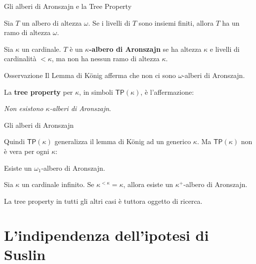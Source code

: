 \documentclass{beamer}
\theoremstyle{num.custom-title}
\theoremstyle{custom-title}
\newcommand{\TP}{\ensuremath{\mathsf{TP}}\xspace}
\renewcommand{\emph}[1]{\textbf{#1}}
\begin{document}
\begin{frame}{Gli alberi di Aronszajn e la Tree Property}

\begin{lemma}[König]
Sia $T$ un albero di altezza $\omega$. Se i livelli di $T$ sono insiemi finiti, allora $T$ ha un ramo di altezza $\omega$.
\end{lemma}

\pause

\begin{definition}
Sia $\kappa$ un cardinale. $T$ è un \emph{$\kappa$-albero di Aronszajn} se ha altezza $\kappa$ e livelli di cardinalità $< \kappa$, ma non ha nessun ramo di altezza $\kappa$.
\end{definition}

\begin{alertblock}{Osservazione}
Il Lemma di König afferma che non ci sono $\omega$-alberi di Aronszajn.
\end{alertblock}

\pause

La \emph{tree property} per $\kappa$, in simboli $\TP(\kappa)$, è l'affermazione: 
\begin{center}
\textit{Non esistono $\kappa$-alberi di Aronszajn}.
\end{center}

\end{frame}


\begin{frame}{Gli alberi di Aronszajn}

Quindi $\TP(\kappa)$ generalizza il lemma di König ad un generico $\kappa$. \pause Ma $\TP(\kappa)$ non è vera per ogni $\kappa$:

\pause

\begin{theorem}[Aronszajn, 1934]
Esiste un $\omega_1$-albero di Aronszajn.
\end{theorem}

\pause

\begin{theorem}[Specker, 1949]
Sia $\kappa$ un cardinale infinito. Se $\kappa^{< \kappa} = \kappa$, allora esiste un $\kappa^+$-albero di Aronszajn.
\end{theorem}

\pause

La tree property in tutti gli altri casi è tuttora oggetto di ricerca.
\end{frame}


\section{L'indipendenza dell'ipotesi di Suslin}
\end{document}
